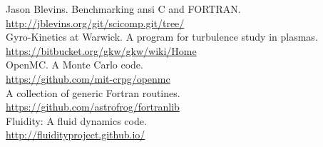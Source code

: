 \documentclass[10pt, oneside, pdftex]{article}
\begin{document}
Jason Blevins. Benchmarking ansi C and FORTRAN.\\
\url{http://jblevins.org/git/scicomp.git/tree/}\\

Gyro-Kinetics at Warwick. A program for turbulence study in plasmas.\\
\url{https://bitbucket.org/gkw/gkw/wiki/Home}\\

OpenMC. A Monte Carlo code.\\
\url{https://github.com/mit-crpg/openmc}\\

A collection of generic Fortran routines.\\
\url{https://github.com/astrofrog/fortranlib}\\

Fluidity: A fluid dynamics code.\\
\url{http://fluidityproject.github.io/}\\



\end{document}

